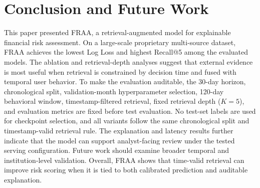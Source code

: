 \documentclass[runningheads]{llncs}
\begin{document}
\section{Conclusion and Future Work}

This paper presented FRAA, a retrieval-augmented model for explainable financial risk assessment. On a large-scale proprietary multi-source dataset, FRAA achieves the lowest Log Loss and highest Recall@5 among the evaluated models. The ablation and retrieval-depth analyses suggest that external evidence is most useful when retrieval is constrained by decision time and fused with temporal user behavior. To make the evaluation auditable, the 30-day horizon, chronological split, validation-month hyperparameter selection, 120-day behavioral window, timestamp-filtered retrieval, fixed retrieval depth ($K=5$), and evaluation metrics are fixed before test evaluation. No test-set labels are used for checkpoint selection, and all variants follow the same chronological split and timestamp-valid retrieval rule. The explanation and latency results further indicate that the model can support analyst-facing review under the tested serving configuration. Future work should examine broader temporal and institution-level validation. Overall, FRAA shows that time-valid retrieval can improve risk scoring when it is tied to both calibrated prediction and auditable explanation.



\end{document}
